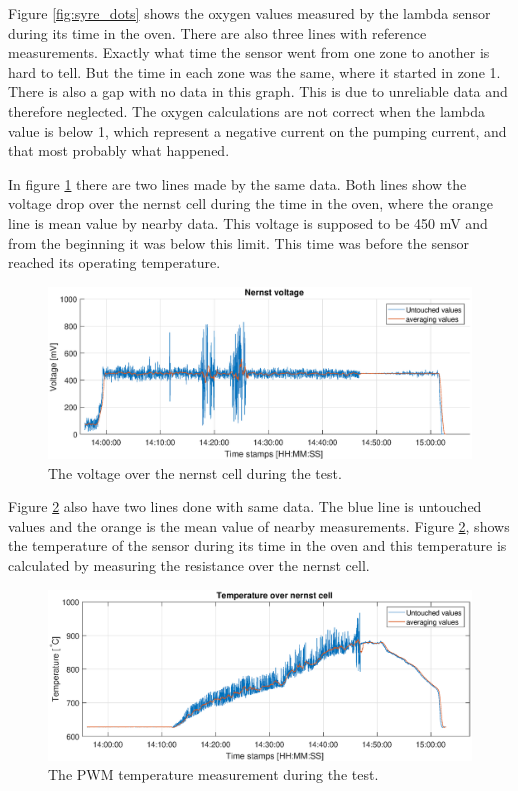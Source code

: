 Figure \ref{fig:syre_dots} shows the oxygen values measured by the lambda sensor during its time in the oven. There are also three lines with reference measurements. Exactly what time the sensor went from one zone to another is hard to tell. But the time in each zone was the same, where it started in zone 1. There is also a gap with no data in this graph. This is due to unreliable data and therefore neglected. The oxygen calculations are not correct when the lambda value is below 1, which represent a negative current on the pumping current, and that most probably what happened.

In figure \ref{fig:nernst_both} there are two lines made by the same data. Both lines show the voltage drop over the nernst cell during the time in the oven, where the orange line is mean value by nearby data. This voltage is supposed to be 450 mV and from the beginning it was below this limit. This time was before the sensor reached its operating temperature.


\begin{figure}
    \centering
    \includegraphics[width=\textwidth]{Chapter4/Figures/nernst_both.eps}
    \caption{The voltage over the nernst cell during the test.}
    \label{fig:nernst_both}
\end{figure}

Figure \ref{fig:temperature_both} also have two lines done with same data. The blue line is untouched values and the orange is the mean value of nearby measurements. Figure \ref{fig:temperature_both}, shows the temperature of the sensor during its time in the oven and this temperature is calculated by measuring the resistance over the nernst cell.





\begin{figure}
    \centering
    \includegraphics[width=\textwidth]{Chapter4/Figures/temperature_both.eps}
    \caption{The PWM temperature measurement during the test.}
    \label{fig:temperature_both}
\end{figure}


